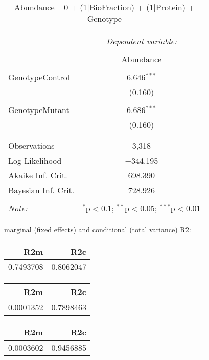 \documentclass[11pt]{report}
\begin{document}
\begin{table}[!htbp] \centering 
  \caption{Abundance ~ 0 + (1|BioFraction) + (1|Protein) + Genotype} 
  \label{} 
\begin{tabular}{@{\extracolsep{5pt}}lc} 
\\[-1.8ex]\hline 
\hline \\[-1.8ex] 
 & \multicolumn{1}{c}{\textit{Dependent variable:}} \\ 
\cline{2-2} 
\\[-1.8ex] & Abundance \\ 
\hline \\[-1.8ex] 
 GenotypeControl & 6.646$^{***}$ \\ 
  & (0.160) \\ 
  & \\ 
 GenotypeMutant & 6.686$^{***}$ \\ 
  & (0.160) \\ 
  & \\ 
\hline \\[-1.8ex] 
Observations & 3,318 \\ 
Log Likelihood & $-$344.195 \\ 
Akaike Inf. Crit. & 698.390 \\ 
Bayesian Inf. Crit. & 728.926 \\ 
\hline 
\hline \\[-1.8ex] 
\textit{Note:}  & \multicolumn{1}{r}{$^{*}$p$<$0.1; $^{**}$p$<$0.05; $^{***}$p$<$0.01} \\ 
\end{tabular} 
\end{table} 
marginal (fixed effects) and conditional (total variance) R2:

\begin{tabular}{r|r}
\hline
R2m & R2c\\
\hline
0.7493708 & 0.8062047\\
\hline
\end{tabular}

\begin{tabular}{r|r}
\hline
R2m & R2c\\
\hline
0.0001352 & 0.7898463\\
\hline
\end{tabular}

\begin{tabular}{r|r}
\hline
R2m & R2c\\
\hline
0.0003602 & 0.9456885\\
\hline
\end{tabular}
\end{document}
